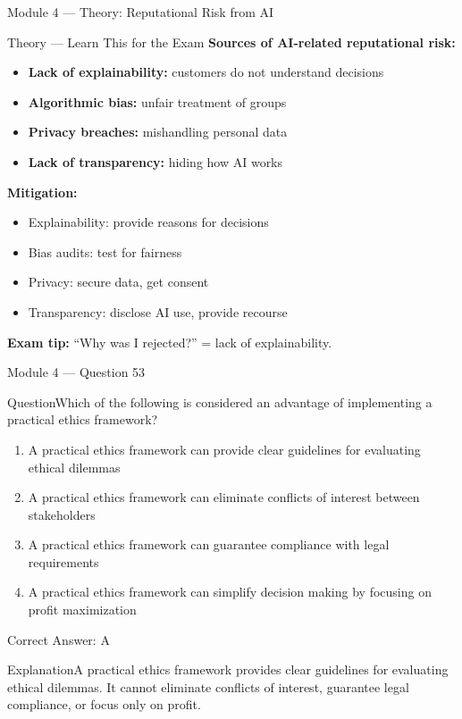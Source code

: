 \documentclass[aspectratio=169,10pt]{beamer}
\newcommand{\question}[1]{\begin{block}{Question}#1\end{block}}
\newcommand{\options}[4]{%
	\begin{enumerate}[label=\Alph*.,leftmargin=*]
		\item #1
		\item #2
		\item #3
		\item #4
	\end{enumerate}
}
\newcommand{\answerbox}[1]{\begin{exampleblock}{Correct Answer: #1}\end{exampleblock}}
\newcommand{\explain}[1]{\begin{block}{Explanation}#1\end{block}}
\newcommand{\theory}[1]{%
	\begin{block}{Theory --- Learn This for the Exam}
		\small #1
	\end{block}
}
\begin{document}
	\begin{frame}{Module 4 --- Theory: Reputational Risk from AI}
		\theory{
			\textbf{Sources of AI-related reputational risk:}
			\begin{itemize}
				\item \textbf{Lack of explainability:} customers do not understand decisions
				\item \textbf{Algorithmic bias:} unfair treatment of groups
				\item \textbf{Privacy breaches:} mishandling personal data
				\item \textbf{Lack of transparency:} hiding how AI works
			\end{itemize}
			\textbf{Mitigation:}
			\begin{itemize}
				\item Explainability: provide reasons for decisions
				\item Bias audits: test for fairness
				\item Privacy: secure data, get consent
				\item Transparency: disclose AI use, provide recourse
			\end{itemize}
			\textbf{Exam tip:} ``Why was I rejected?'' = lack of explainability.
		}
	\end{frame}
	
	\begin{frame}{Module 4 --- Question 53}
		\question{Which of the following is considered an advantage of implementing a practical ethics framework?}
		\options{A practical ethics framework can provide clear guidelines for evaluating ethical dilemmas}{A practical ethics framework can eliminate conflicts of interest between stakeholders}{A practical ethics framework can guarantee compliance with legal requirements}{A practical ethics framework can simplify decision making by focusing on profit maximization}
		\answerbox{A}
		\explain{A practical ethics framework provides clear guidelines for evaluating ethical dilemmas. It cannot eliminate conflicts of interest, guarantee legal compliance, or focus only on profit.}
	\end{frame}
	
\end{document}
